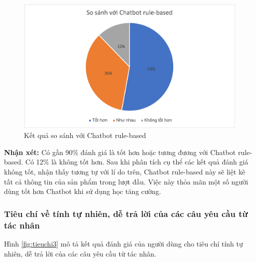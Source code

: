 \begin{center}
    \begin{figure}[h!]
        \begin{center}
         \includegraphics[scale=0.91]{chapter7/img/tieuchi2_2.png}
        \end{center}
        \caption{Kết quả so sánh với Chatbot rule-based}
        \label{fig:tieuchi22}
    \end{figure}
\end{center}

\textbf{Nhận xét:}
Có gần 90\% đánh giá là tốt hơn hoặc tương đương với Chatbot rule-based. Có 12\% là không tốt hơn. Sau khi phân tích cụ thể các kết quả đánh giá không tốt, nhận thấy tương tự với lí do trên, Chatbot rule-based này sẽ liệt kê tất cả thông tin của sản phẩm trong lượt đầu. Việc này thỏa mãn một số người dùng tốt hơn Chatbot khi sử dụng học tăng cường.

\subsubsection{Tiêu chí về tính tự nhiên, dễ trả lời của các câu yêu cầu từ tác nhân}
Hình \ref{fig:tieuchi3} mô tả kết quả đánh giá của người dùng cho tiêu chí tính tự nhiên, dễ trả lời của các câu yêu cầu từ tác nhân.

